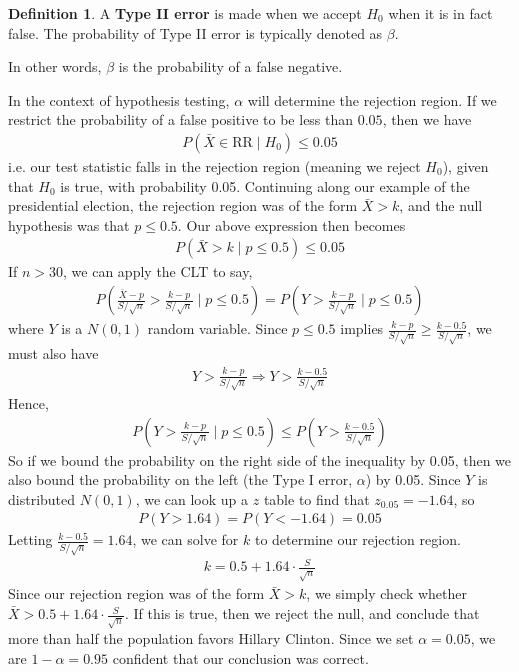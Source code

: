 \documentclass{tufte-book}
\theoremstyle{definition}
\numberwithin{theorem}{section}
\newtheorem{definition}[theorem]{Definition}
\numberwithin{definition}{section}
\numberwithin{lemma}{section}
\numberwithin{corollary}{section}
\numberwithin{proposition}{section}
\numberwithin{remark}{section}
\numberwithin{claim}{section}
\numberwithin{observation}{section}
\numberwithin{fact}{section}
\numberwithin{assumption}{section}
\numberwithin{example}{section}
\numberwithin{exercise}{section}
\begin{document}
\begin{definition}
A \textbf{Type II error} is made when we accept $H_0$ when it is in fact false. The probability of Type II error is typically denoted as $\beta$.
\end{definition}
In other words, $\beta$ is the probability of a false negative.

In the context of hypothesis testing, $\alpha$ will determine the rejection region. If we restrict the probability of a false positive to be less than $0.05$, then we have
\begin{align*}
P(\bar{X} \in \text{RR} \mid H_0 ) \leq 0.05
\end{align*}
i.e. our test statistic falls in the rejection region (meaning we reject $H_0$), given that $H_0$ is true, with probability 0.05. Continuing along our example of the presidential election, the rejection region was of the form $\bar{X} > k$, and the null hypothesis was that $p \leq 0.5$. Our above expression then becomes
\begin{align*}
P(\bar{X} > k \mid p \leq 0.5) \leq 0.05
\end{align*}
If $n > 30$, we can apply the CLT to say,
\begin{align*}
P(\frac{\bar{X}-p}{S/\sqrt{n}} > \frac{k-p}{S/\sqrt{n}} \mid p \leq 0.5) = P(Y > \frac{k-p}{S/\sqrt{n}} \mid p \leq 0.5) 
\end{align*}
where $Y$ is a $N(0,1)$ random variable. Since $p \leq 0.5$ implies $\frac{k-p}{S/\sqrt{n}} \geq \frac{k-0.5}{S/\sqrt{n}}$, we must also have
\begin{align*}
Y > \frac{k - p}{S/\sqrt{n}} \Rightarrow Y > \frac{k-0.5}{S/\sqrt{n}}
\end{align*}
Hence,
\begin{align*}
P(Y > \frac{k-p}{S/\sqrt{n}} \mid p \leq 0.5) \leq P(Y > \frac{k-0.5}{S/\sqrt{n}})
\end{align*}
So if we bound the probability on the right side of the inequality by 0.05, then we also bound the probability on the left (the Type I error, $\alpha$) by 0.05. Since $Y$ is distributed $N(0,1)$, we can look up a $z$ table to find that $z_{0.05} = -1.64$, so
\begin{align*}
P(Y > 1.64) = P(Y < -1.64) = 0.05
\end{align*}
Letting $\frac{k-0.5}{S/\sqrt{n}} = 1.64$, we can solve for $k$ to determine our rejection region. 
\begin{align*}
k = 0.5 + 1.64 \cdot \frac{S}{\sqrt{n}}
\end{align*}
Since our rejection region was of the form $\bar{X} > k$, we simply check whether $\bar{X} > 0.5 + 1.64 \cdot \frac{S}{\sqrt{n}}$. If this is true, then we reject the null, and conclude that more than half the population favors Hillary Clinton. Since we set $\alpha = 0.05$, we are $1-\alpha = 0.95$ confident that our conclusion was correct.
\end{document}
